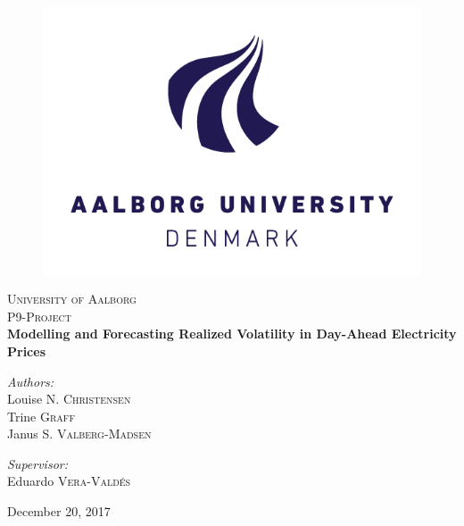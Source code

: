 \begin{titlepage}
\begin{center}


\begin{figure}[htbp]
	\centering
	\includegraphics[width=\textwidth]{./fig/aaulogo.jpg}
\end{figure}

\vspace{2cm}


\textsc{\LARGE University of Aalborg}\\
\textsc{\Large P9-Project }\\[0.5cm]

{ \huge \bfseries Modelling and Forecasting Realized Volatility in Day-Ahead Electricity Prices\\[1.4cm] }



\begin{minipage}{0.4\textwidth}
\begin{flushleft} \large
\emph{Authors:}\\
Louise  \textsc{N. Christensen}\\
Trine \textsc{Graff}\\
Janus \textsc{S. Valberg-Madsen} \\

\end{flushleft}
\end{minipage}
\begin{minipage}{0.4\textwidth}
\begin{flushright} \large
\emph{Supervisor:} \\
Eduardo \textsc{Vera-Valdés}\\
\phantom{hej}

\end{flushright}
\end{minipage}

\vfill

{\large December 20, 2017}

\end{center}
\end{titlepage}
